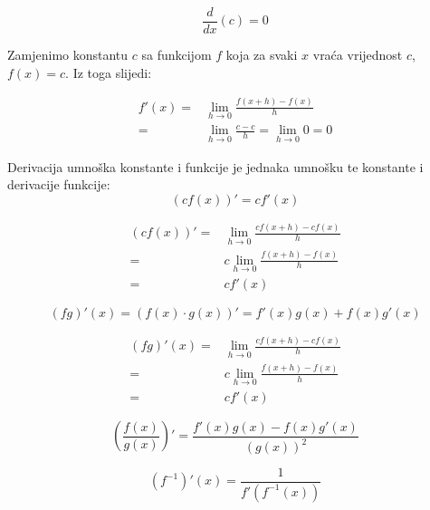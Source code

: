 \begin{multicols}{2}
\begin{propositionbox}
    $$
        \frac{d}{dx}(c) = 0
    $$
\end{propositionbox}

Zamjenimo konstantu $c$ sa funkcijom $f$ koja za svaki $x$ vraća vrijednost $c$, $f(x)=c$.
Iz toga slijedi:

\begin{align*}
    f'(x) =& \lim_{h\to 0}\frac{f(x+h)-f(x)}{h}\\
          =& \lim_{h\to 0}\frac{c - c}{h} = \lim_{h\to 0}0 = 0
\end{align*}

\begin{propositionbox}
    Derivacija umnoška konstante i funkcije je jednaka umnošku te konstante i derivacije funkcije:
    $$
        (cf(x))' = cf'(x)
    $$
\end{propositionbox}

\begin{align*}
    (cf(x))'=&\lim_{h\to 0}\frac{cf(x+h)-cf(x)}{h}\\
            =&c\lim_{h\to 0}\frac{f(x+h)-f(x)}{h}\\
            =&cf'(x)
\end{align*}

\end{multicols}

\begin{propositionbox}
    \label{eq:diff_prod}
    $$
        (fg)'(x) = (f(x)\cdot g(x))' = f'(x)g(x) + f(x)g'(x)
    $$
\end{propositionbox}

\begin{align*}
    (fg)'(x)=&\lim_{h\to 0}\frac{cf(x+h)-cf(x)}{h}\\
    =&c\lim_{h\to 0}\frac{f(x+h)-f(x)}{h}\\
    =&cf'(x)
\end{align*}

\begin{propositionbox}
    $$
        \left(\frac{f(x)}{g(x)}\right)' = \frac{f'(x)g(x) - f(x)g'(x)}{(g(x))^2}
    $$
\end{propositionbox}

\begin{propositionbox}
    $$
        (f^{-1})'(x) = \frac{1}{f'(f^{-1}(x))}
    $$
\end{propositionbox}

